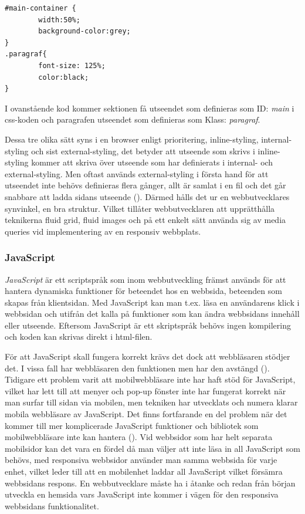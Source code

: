 \documentclass[11pt]{article}
\begin{document}
\begin{verbatim}
#main-container {
        width:50%;
        background-color:grey;
}
.paragraf{
        font-size: 125%;
        color:black;
}
\end{verbatim}
\vspace{0.5cm}

I ovanstående kod kommer sektionen få utseendet som definieras som ID: \textit{main} i css-koden och paragrafen utseendet som definieras som Klass: \textit{paragraf}.


Dessa tre olika sätt syns i en browser enligt prioritering, inline-styling, internal-styling och sist external-styling, det betyder att utseende som skrivs i inline-styling kommer att skriva över utseende som har definierats i internal- och external-styling. Men oftast används external-styling i första hand för att utseendet inte behövs definieras flera gånger, allt är samlat i en fil och det går snabbare att ladda sidans utseende (\cite{css}). Därmed hålls det ur en webbutvecklares synvinkel, en bra struktur. Vilket tillåter webbutvecklaren att upprätthålla teknikerna fluid grid, fluid images och på ett enkelt sätt använda sig av media queries vid implementering av en responsiv webbplats.

\subsubsection{JavaScript}
\textit{JavaScript} är ett scriptspråk som inom webbutveckling främst används för att hantera dynamiska funktioner för beteendet hos en webbsida, beteenden som skapas från klientsidan. Med JavaScript kan man t.ex. läsa en användarens klick i webbsidan och utifrån det kalla på funktioner som kan ändra webbsidans innehåll eller utseende. Eftersom JavaScript är ett skriptspråk behövs ingen kompilering och koden kan skrivas direkt i html-filen.

För att JavaScript skall fungera korrekt krävs det dock att webbläsaren stödjer det. I vissa fall har webbläsaren den funktionen men har den avstängd (\cite[s.13]{sara_ingmar}). Tidigare ett problem varit att mobilwebbläsare inte har haft stöd för JavaScript, vilket har lett till att menyer och pop-up fönster inte har fungerat korrekt när man surfar till sidan via mobilen, men tekniken har utvecklats och numera klarar mobila webbläsare av JavaScript. Det finns fortfarande en del problem när det kommer till mer komplicerade JavaScript funktioner och bibliotek som mobilwebbläsare inte kan hantera (\cite{quirksmode}). Vid webbsidor som har helt separata mobilsidor kan det vara en fördel då man väljer att inte läsa in all JavaScript som behövs, med responsiva webbsidor använder man samma webbsida för varje enhet, vilket leder till att en mobilenhet laddar all JavaScript vilket försämra webbsidans respons. En webbutvecklare måste ha i åtanke och redan från början utveckla en hemsida vars JavaScript inte kommer i vägen för den responsiva webbsidans funktionalitet.
\newpage
\end{document}
